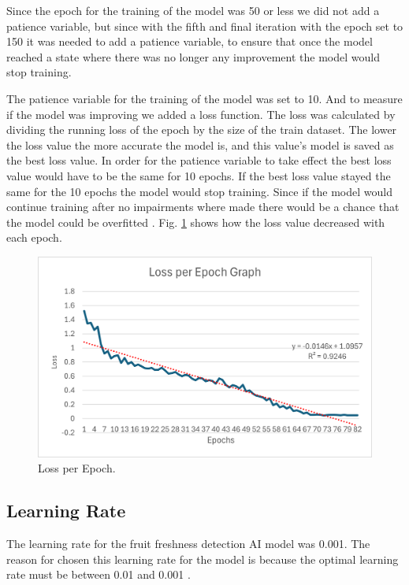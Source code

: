 \documentclass[conference]{IEEEtran}
\begin{document}
Since the epoch for the training of the model was 50 or less we did not add a patience variable, but since with the fifth and final iteration with the epoch set to 150 it was needed to add a patience variable, to ensure that once the model reached a state where there was no longer any improvement the model would stop training.

The patience variable for the training of the model was set to 10. And to measure if the model was improving we added a loss function. The loss was calculated by dividing the running loss of the epoch by the size of the train dataset. The lower the loss value the more accurate the model is, and this value's model is saved as the best loss value. In order for the patience variable to take effect the best loss value would have to be the same for 10 epochs. If the best loss value stayed the same for the 10 epochs the model would stop training. Since if the model would continue training after no impairments where made there would be a chance that the model could be overfitted \cite{b5}. Fig. \ref{fig5} shows how the loss value decreased with each epoch.

\begin{figure}[h]
    \centering
    \includegraphics[width=\linewidth]{Loss_per_Epoch_Graph.png}
    \caption{Loss per Epoch.}
    \label{fig5}
\end{figure}

\subsection{Learning Rate}
The learning rate for the fruit freshness detection AI model was 0.001. The reason for chosen this learning rate for the model is because the optimal learning rate must be between 0.01 and 0.001 \cite{b34}.
\end{document}
